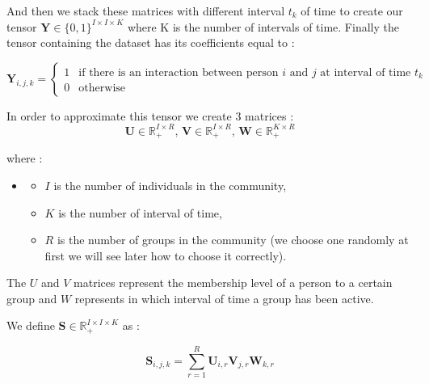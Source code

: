 \documentclass{article}
\begin{document}
And then we stack these matrices with different interval $t_k$ of time to create our tensor $\mathbf{Y} \in \{0, 1\}^{I \times I \times K}$
where K is the number of intervals of time. Finally the tensor containing the dataset has its coefficients equal to :

\[
    \mathbf{Y}_{i,j,k} = 
    \begin{cases}
        1 & \text{if there is an interaction between person $i$ and $j$ at interval of time $t_k$} \\
        0 & \text{otherwise}
    \end{cases}
\]

In order to approximate this tensor we create 3 matrices :
\[
    \mathbf{U} \in \mathbb{R}_+^{I \times R}, \,
    \mathbf{V} \in \mathbb{R}_+^{I \times R}, \,
    \mathbf{W} \in \mathbb{R}_+^{K \times R}
\]

where :
\begin{itemize}
    \item[]
    \begin{itemize}
        \item $I$ is the number of individuals in the community,
        \item $K$ is the number of interval of time,
        \item $R$ is the number of groups in the community (we choose one randomly at first we will see later how to choose it correctly).
    \end{itemize}
\end{itemize}

The $U$ and $V$ matrices represent the membership level of a person to a certain group
and $W$ represents in which interval of time a group has been active.




We define $\mathbf{S} \in \mathbb{R}_+^{I \times I \times K}$ as :

\[
    \mathbf{S}_{i,j,k} = \sum_{r = 1}^R \mathbf{U}_{i,r}\mathbf{V}_{j,r}\mathbf{W}_{k, r}
\]
\end{document}
